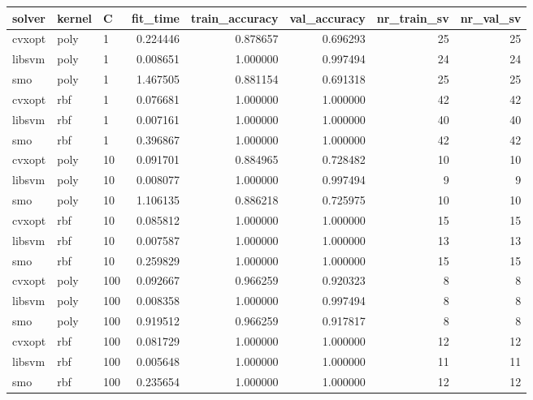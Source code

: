 \begin{tabular}{lllrrrrr}
\toprule
solver & kernel &   C &  fit\_time &  train\_accuracy &  val\_accuracy &  nr\_train\_sv &  nr\_val\_sv \\
\midrule
cvxopt &   poly &   1 &  0.224446 &        0.878657 &      0.696293 &           25 &         25 \\
libsvm &   poly &   1 &  0.008651 &        1.000000 &      0.997494 &           24 &         24 \\
   smo &   poly &   1 &  1.467505 &        0.881154 &      0.691318 &           25 &         25 \\
cvxopt &    rbf &   1 &  0.076681 &        1.000000 &      1.000000 &           42 &         42 \\
libsvm &    rbf &   1 &  0.007161 &        1.000000 &      1.000000 &           40 &         40 \\
   smo &    rbf &   1 &  0.396867 &        1.000000 &      1.000000 &           42 &         42 \\
cvxopt &   poly &  10 &  0.091701 &        0.884965 &      0.728482 &           10 &         10 \\
libsvm &   poly &  10 &  0.008077 &        1.000000 &      0.997494 &            9 &          9 \\
   smo &   poly &  10 &  1.106135 &        0.886218 &      0.725975 &           10 &         10 \\
cvxopt &    rbf &  10 &  0.085812 &        1.000000 &      1.000000 &           15 &         15 \\
libsvm &    rbf &  10 &  0.007587 &        1.000000 &      1.000000 &           13 &         13 \\
   smo &    rbf &  10 &  0.259829 &        1.000000 &      1.000000 &           15 &         15 \\
cvxopt &   poly & 100 &  0.092667 &        0.966259 &      0.920323 &            8 &          8 \\
libsvm &   poly & 100 &  0.008358 &        1.000000 &      0.997494 &            8 &          8 \\
   smo &   poly & 100 &  0.919512 &        0.966259 &      0.917817 &            8 &          8 \\
cvxopt &    rbf & 100 &  0.081729 &        1.000000 &      1.000000 &           12 &         12 \\
libsvm &    rbf & 100 &  0.005648 &        1.000000 &      1.000000 &           11 &         11 \\
   smo &    rbf & 100 &  0.235654 &        1.000000 &      1.000000 &           12 &         12 \\
\bottomrule
\end{tabular}
